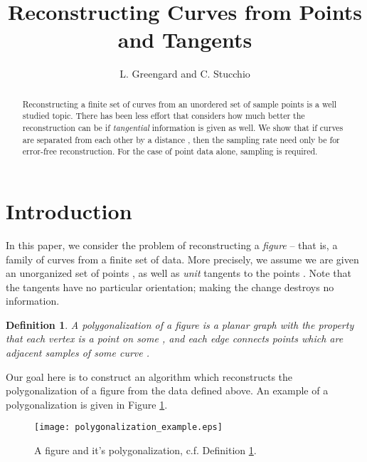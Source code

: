 \documentclass{article}
\newtheorem{definition}[cntr]{Definition}
\numberwithin{cntr}{section}
\numberwithin{equation}{section}
\begin{document}
\title{Reconstructing Curves from Points and Tangents}

\author{L. Greengard and C. Stucchio}

\maketitle

\begin{abstract}
Reconstructing a finite set of curves from an unordered set of sample points
is a well studied topic. There has been less
effort that considers how much better the reconstruction can be if
\emph{tangential} information is given as well.
We show that if curves are separated from each other by a
distance , then the sampling rate need only be 
for error-free reconstruction.
For the case of point data alone,  sampling is required.
\end{abstract}

\section{Introduction}

In this paper, we consider the problem of reconstructing a
 \emph{figure} -- that is, a family of curves  from a finite
set of data. More precisely, we assume we are given
an unorganized set of points , as well as \emph{unit} tangents to the points . Note that the tangents have no particular orientation; making the change  destroys no information.

\begin{definition}
  \label{def:polygonalization}
  A polygonalization of a figure  is a planar graph
 with the property that each vertex  is a point on some , and each edge connects points which are adjacent samples of some curve .
\end{definition}

Our goal here is to construct an algorithm which reconstructs the
polygonalization of a figure from the data defined above.
An example of a polygonalization is given in Figure \ref{fig:polygonalization}.

\begin{figure}
\setlength{\unitlength}{0.240900pt}
\ifx\plotpoint\undefined\newsavebox{\plotpoint}\fi
\sbox{\plotpoint}{\rule[-0.200pt]{0.400pt}{0.400pt}}\texttt{[image: polygonalization\_example.eps]}
\caption{A figure and it's polygonalization, c.f. Definition \ref{def:polygonalization}. }
\label{fig:polygonalization}
\end{figure}
\end{document}
